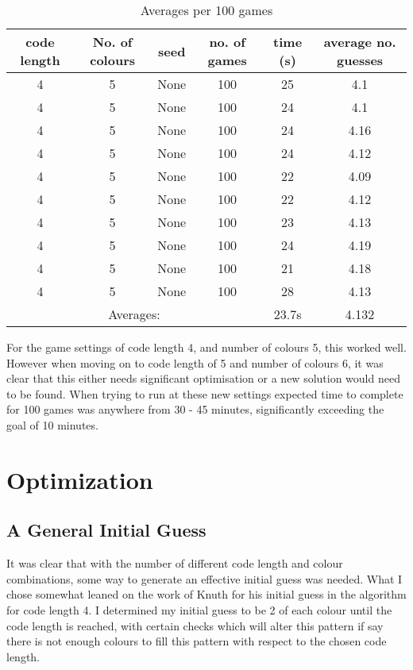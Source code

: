 \documentclass[12pt]{article}
\begin{document}
\begin{table}[htbp]
\centering
\begin{tabular}{|c|c|c|c|c|c|}
\hline
code length & No. of colours & seed & no. of games & time (s) & average no. guesses\\\hline
4 & 5 & None & 100 & 25 & 4.1\\
4 & 5 & None & 100 & 24 & 4.1\\
4 & 5 & None & 100 & 24 & 4.16\\
4 & 5 & None & 100 & 24 & 4.12\\
4 & 5 & None & 100 & 22 & 4.09\\
4 & 5 & None & 100 & 22 & 4.12\\
4 & 5 & None & 100 & 23 & 4.13\\
4 & 5 & None & 100 & 24 & 4.19\\
4 & 5 & None & 100 & 21 & 4.18\\
4 & 5 & None & 100 & 28 & 4.13\\
\hline
\multicolumn{4}{|c|}{Averages: } & 23.7s & 4.132\\
\hline
\end{tabular}
\caption{\label{tab:results1}Averages per 100 games}
\end{table}

For the game settings of code length 4, and number of colours 5, this worked well. However when moving on to code length of 5 and number of colours 6, it was clear that this either needs significant optimisation or a new solution would need to be found. When trying to run at these new settings expected time to complete for 100 games was anywhere from 30 - 45 minutes, significantly exceeding the goal of 10 minutes.

\section{Optimization}
\subsection{A General Initial Guess}
It was clear that with the number of different code length and colour combinations, some way to generate an effective initial guess was needed. What I chose somewhat leaned on the work of Knuth for his initial guess in the algorithm for code length 4. I determined my initial guess to be 2 of each colour until the code length is reached, with certain checks which will alter this pattern if say there is not enough colours to fill this pattern with respect to the chosen code length.
\end{document}
